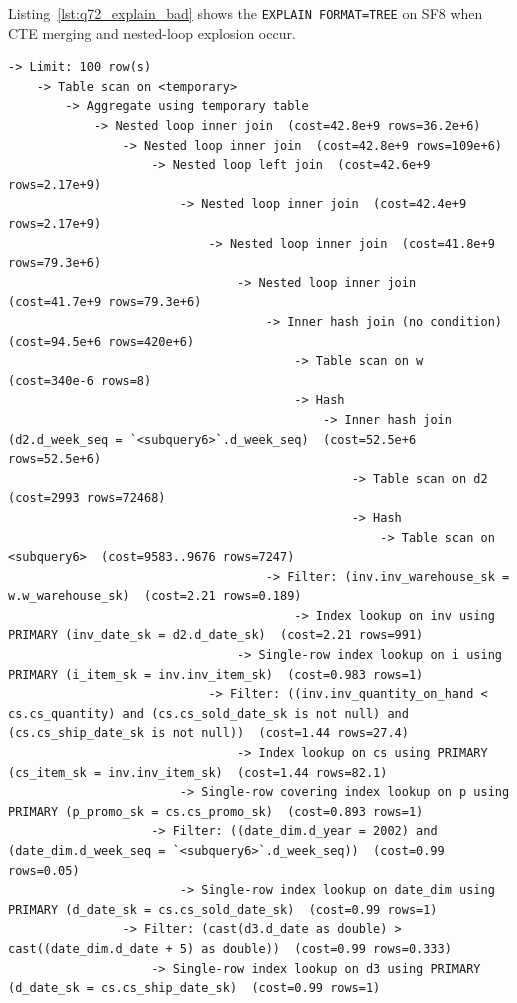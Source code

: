 \documentclass{ULBreport}
\begin{document}
Listing~\ref{lst:q72_explain_bad} shows the \texttt{EXPLAIN FORMAT=TREE} on SF8 when CTE merging and nested-loop explosion occur.

\begin{lstlisting}[caption={Unmaterialised \texttt{EXPLAIN FORMAT=TREE} on SF8 for Query 72 Showing 2.17B-Row Explosion}, label={lst:q72_explain_bad}, basicstyle=\ttfamily\scriptsize, breaklines=true, frame=single]
-> Limit: 100 row(s)
    -> Table scan on <temporary>
        -> Aggregate using temporary table
            -> Nested loop inner join  (cost=42.8e+9 rows=36.2e+6)
                -> Nested loop inner join  (cost=42.8e+9 rows=109e+6)
                    -> Nested loop left join  (cost=42.6e+9 rows=2.17e+9)
                        -> Nested loop inner join  (cost=42.4e+9 rows=2.17e+9)
                            -> Nested loop inner join  (cost=41.8e+9 rows=79.3e+6)
                                -> Nested loop inner join  (cost=41.7e+9 rows=79.3e+6)
                                    -> Inner hash join (no condition)  (cost=94.5e+6 rows=420e+6)
                                        -> Table scan on w  (cost=340e-6 rows=8)
                                        -> Hash
                                            -> Inner hash join (d2.d_week_seq = `<subquery6>`.d_week_seq)  (cost=52.5e+6 rows=52.5e+6)
                                                -> Table scan on d2  (cost=2993 rows=72468)
                                                -> Hash
                                                    -> Table scan on <subquery6>  (cost=9583..9676 rows=7247)
                                    -> Filter: (inv.inv_warehouse_sk = w.w_warehouse_sk)  (cost=2.21 rows=0.189)
                                        -> Index lookup on inv using PRIMARY (inv_date_sk = d2.d_date_sk)  (cost=2.21 rows=991)
                                -> Single-row index lookup on i using PRIMARY (i_item_sk = inv.inv_item_sk)  (cost=0.983 rows=1)
                            -> Filter: ((inv.inv_quantity_on_hand < cs.cs_quantity) and (cs.cs_sold_date_sk is not null) and (cs.cs_ship_date_sk is not null))  (cost=1.44 rows=27.4)
                                -> Index lookup on cs using PRIMARY (cs_item_sk = inv.inv_item_sk)  (cost=1.44 rows=82.1)
                        -> Single-row covering index lookup on p using PRIMARY (p_promo_sk = cs.cs_promo_sk)  (cost=0.893 rows=1)
                    -> Filter: ((date_dim.d_year = 2002) and (date_dim.d_week_seq = `<subquery6>`.d_week_seq))  (cost=0.99 rows=0.05)
                        -> Single-row index lookup on date_dim using PRIMARY (d_date_sk = cs.cs_sold_date_sk)  (cost=0.99 rows=1)
                -> Filter: (cast(d3.d_date as double) > cast((date_dim.d_date + 5) as double))  (cost=0.99 rows=0.333)
                    -> Single-row index lookup on d3 using PRIMARY (d_date_sk = cs.cs_ship_date_sk)  (cost=0.99 rows=1)
\end{lstlisting}
\end{document}
